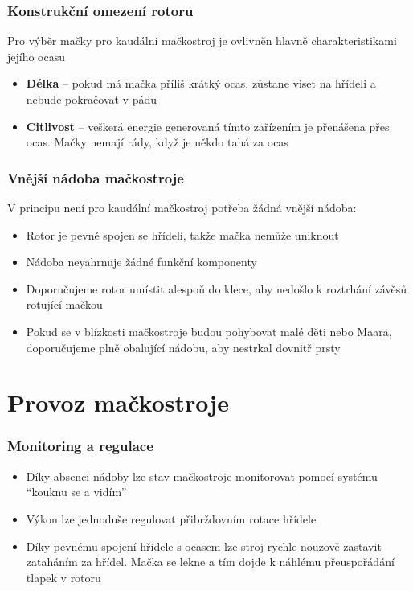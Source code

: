 \documentclass{beamer}
\newcommand{\mypause}{\pause}
\begin{document}
\begin{frame}
    \frametitle{Konstrukční omezení rotoru}
    Pro výběr mačky pro kaudální mačkostroj je ovlivněn hlavně charakteristikami jejího ocasu
    \begin{itemize}
        \item \textbf{Délka}  --  pokud má mačka příliš krátký ocas, zůstane viset na hřídeli a nebude pokračovat v pádu
        \item \textbf{Citlivost}  -- veškerá energie generovaná tímto zařízením je přenášena přes ocas. Mačky nemají rády, když je někdo tahá za ocas
    \end{itemize}
\end{frame}

\begin{frame}
    \frametitle{Vnější nádoba mačkostroje}
    V principu není pro kaudální mačkostroj potřeba žádná vnější nádoba:
    \begin{itemize}
        \item Rotor je pevně spojen se hřídelí, takže mačka nemůže uniknout
        \item Nádoba neyahrnuje žádné funkční komponenty
        \mypause
        \item Doporučujeme rotor umístit alespoň do klece, aby nedošlo k roztrhání závěsů rotující mačkou
        \mypause
        \item Pokud se v blízkosti mačkostroje budou pohybovat malé děti nebo Maara, doporučujeme plně obalující nádobu, aby nestrkal dovnitř prsty
    \end{itemize}
\end{frame}

\section{Provoz mačkostroje}
\begin{frame}
    \frametitle{Monitoring a regulace}
    \begin{itemize}
        \item Díky absenci nádoby lze stav mačkostroje monitorovat pomocí systému \textquotedblleft kouknu se a vidím\textquotedblright
        \mypause
        \item Výkon lze jednoduše regulovat přibržďovním rotace hřídele
        \mypause
        \item Díky pevnému spojení hřídele s ocasem lze stroj rychle nouzově zastavit zataháním za hřídel. Mačka se lekne a tím dojde k náhlému přeuspořádání tlapek v rotoru
    \end{itemize}
\end{frame}
\end{document}
